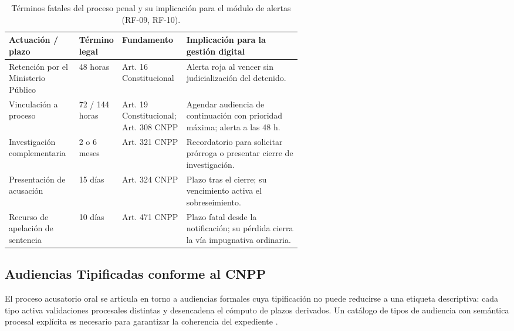 \begin{table}[H]
  \centering
  \caption{Términos fatales del proceso penal y su implicación para el módulo de alertas (RF-09, RF-10).}
  \label{tab:terminos-fatales}
  \begin{tabularx}{\linewidth}{@{}L{0.24\linewidth}L{0.12\linewidth}L{0.22\linewidth}X@{}}
    \toprule
    \textbf{Actuación / plazo} & \textbf{Término legal} & \textbf{Fundamento} & \textbf{Implicación para la gestión digital} \\
    \midrule
    Retención por el Ministerio Público & 48 horas & Art. 16 Constitucional & Alerta roja al vencer sin judicialización del detenido. \\
    \addlinespace
    Vinculación a proceso & 72 / 144 horas & Art. 19 Constitucional; Art. 308 CNPP \cite{cnpp2021} & Agendar audiencia de continuación con prioridad máxima; alerta a las 48 h. \\
    \addlinespace
    Investigación complementaria & 2 o 6 meses & Art. 321 CNPP \cite{cnpp2021} & Recordatorio para solicitar prórroga o presentar cierre de investigación. \\
    \addlinespace
    Presentación de acusación & 15 días & Art. 324 CNPP \cite{cnpp2021} & Plazo tras el cierre; su vencimiento activa el sobreseimiento. \\
    \addlinespace
    Recurso de apelación de sentencia & 10 días & Art. 471 CNPP \cite{cnpp2021} & Plazo fatal desde la notificación; su pérdida cierra la vía impugnativa ordinaria. \\
    \bottomrule
  \end{tabularx}
\end{table}

\subsection{Audiencias Tipificadas conforme al CNPP}\label{sec:audiencias-tipificadas}

El proceso acusatorio oral se articula en torno a audiencias formales cuya tipificación no puede reducirse a una etiqueta descriptiva: cada tipo activa validaciones procesales distintas y desencadena el cómputo de plazos derivados. Un catálogo de tipos de audiencia con semántica procesal explícita es necesario para garantizar la coherencia del expediente \cite{cnpp2021,oaj2023guiacnpp}.

